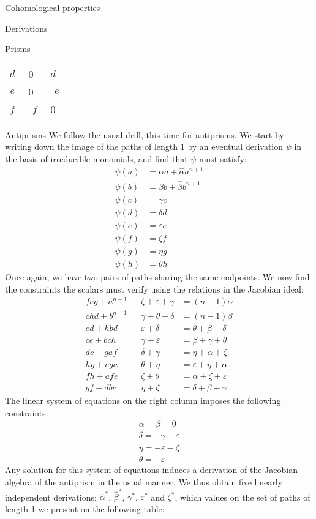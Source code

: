\begin{chapter}{Cohomological properties}
\begin{section}{Derivations}
\begin{subsection}{Prisms}
\begin{center}
\begin{tabular}{ c | c | c }
$d$ & 	0		& $d$	\\
$e$ & 0		& $-e$ \\
$f$ & $-f$		& 0
\end{tabular}
\end{center}
\end{subsection}
\begin{subsection}{Antiprisms}
We follow the usual drill, this time for antiprisms. We start by writing down the image of the paths of length 1 by an eventual derivation $\psi$ in the basis of irreducible monomials, and find that $\psi$ must satisfy:
\begin{align*}
\psi(a) &= \alpha a +\hat\alpha a^{n+1}\\
\psi(b) &= \beta b + \hat\beta b^{n+1}\\
\psi(c) &= \gamma c \\
\psi(d) &= \delta d \\
\psi(e) &= \varepsilon e \\
\psi(f) &= \zeta f \\
\psi(g) &= \eta g \\
\psi(h) &= \theta h
\end{align*}
Once again, we have two pairs of paths sharing the same endpoints. We now find the constraints the scalars must verify using the relations in the Jacobian ideal:
\begin{align*}
feg+a^{n-1} &  	&\zeta+\varepsilon+\gamma 	&=(n-1)\alpha\\
chd+b^{n-1}  &  	&\gamma+\theta+\delta 		&=(n-1)\beta\\
ed+hbd	&	&\varepsilon+\delta		&=\theta+\beta+\delta\\
ce+bch	&	&\gamma+\varepsilon		&=\beta+\gamma+\theta\\
dc+gaf	&	&\delta+\gamma			&=\eta+\alpha+\zeta\\
hg+ega	&	&\theta+\eta			&=\varepsilon+\eta+\alpha\\
fh+afe	&	&\zeta+\theta			&=\alpha+\zeta+\varepsilon\\
gf+dbc	&	&\eta+\zeta				&=\delta+\beta+\gamma
\end{align*} 
The linear system of equations on the right column imposes the following constraints:
\begin{align*}
\alpha=\beta=0\\
\delta=-\gamma-\varepsilon\\
\eta=-\varepsilon-\zeta\\
\theta=-\varepsilon
\end{align*}
Any solution for this system of equations induces a derivation of the Jacobian algebra of the antiprism in the usual manner. We thus obtain five linearly independent derivations: $\hat\alpha^*$, $\hat\beta^*$, $\gamma^*$, $\varepsilon^*$ and $\zeta^*$, which values on the set of paths of length 1 we present on the following table:

\end{subsection}
\end{section}
\end{chapter}
